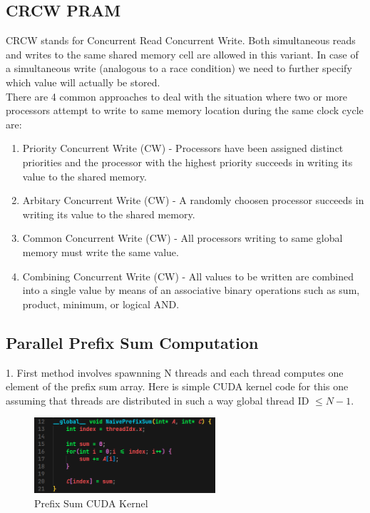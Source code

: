 \documentclass{article}
\begin{document}
\subsection*{CRCW PRAM}
CRCW stands for Concurrent Read Concurrent Write. Both simultaneous reads and writes to the same shared memory cell are allowed in this variant. In case of a simultaneous write (analogous to a race condition) we need to further specify which value will actually be stored. \\

There are 4 common approaches to deal with the situation where two or more processors attempt to write to same memory location during the same clock cycle are:
\begin{enumerate}
    \item Priority Concurrent Write (CW) - Processors have been assigned distinct priorities and the processor with the highest priority succeeds in writing its value to the shared memory.
    \item Arbitary Concurrent Write (CW) - A randomly choosen processor succeeds in writing its value to the shared memory.
    \item Common Concurrent Write (CW) - All processors writing to same global memory must write the same value.
    \item Combining Concurrent Write (CW) - All values to be written are combined into a single value by means of an associative binary operations such as sum, product, minimum, or logical AND.
\end{enumerate}

\subsection*{Parallel Prefix Sum Computation}
1. First method involves spawnning N threads and each thread computes one element of the prefix sum array. Here is simple CUDA kernel code for this one assuming that threads are distributed in such a way global thread ID $\leq N-1$.

\begin{figure}[h]
    \centering
    \includegraphics[width=0.6\textwidth]{Images/prefix1.png}
    \caption{Prefix Sum CUDA Kernel}
\end{figure}
\end{document}
